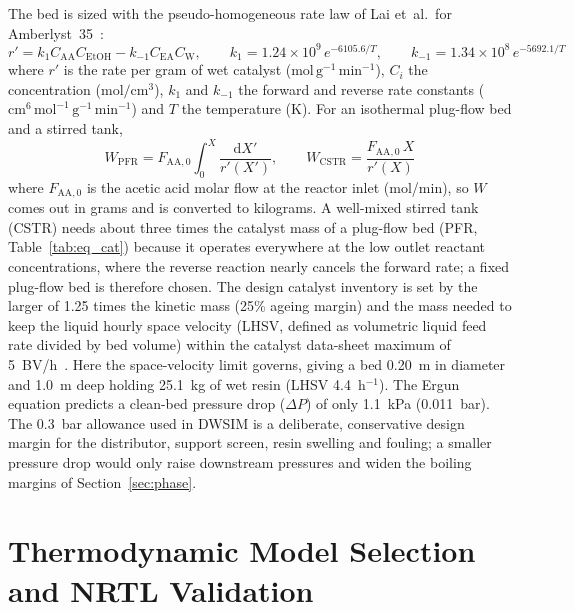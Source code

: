 \documentclass[10pt,a4paper]{article}
\begin{document}
The bed is sized with the pseudo-homogeneous rate law of Lai et~al.\ for Amberlyst~35~\cite{ref7}:
\begin{equation}
r' = k_1 C_{\mathrm{AA}} C_{\mathrm{EtOH}} - k_{-1} C_{\mathrm{EA}} C_{\mathrm{W}}, \qquad
k_1 = 1.24 \times 10^9\, e^{-6105.6/T}, \qquad
k_{-1} = 1.34 \times 10^8\, e^{-5692.1/T}
\label{eq:rate}
\end{equation}
where $r'$ is the rate per gram of wet catalyst ($\mathrm{mol\,g^{-1}\,min^{-1}}$), $C_i$ the concentration ($\mathrm{mol/cm^3}$), $k_1$ and $k_{-1}$ the forward and reverse rate constants ($\mathrm{cm^6\,mol^{-1}\,g^{-1}\,min^{-1}}$) and $T$ the temperature (K). For an isothermal plug-flow bed and a stirred tank,
\begin{equation}
W_{\mathrm{PFR}} = F_{\mathrm{AA},0} \int_0^X \frac{\mathrm{d}X'}{r'(X')}, \qquad
W_{\mathrm{CSTR}} = \frac{F_{\mathrm{AA},0}\, X}{r'(X)}
\label{eq:sizing}
\end{equation}
where $F_{\mathrm{AA},0}$ is the acetic acid molar flow at the reactor inlet (mol/min), so $W$ comes out in grams and is converted to kilograms. A well-mixed stirred tank (CSTR) needs about three times the catalyst mass of a plug-flow bed (PFR, Table~\ref{tab:eq_cat}) because it operates everywhere at the low outlet reactant concentrations, where the reverse reaction nearly cancels the forward rate; a fixed plug-flow bed is therefore chosen. The design catalyst inventory is set by the larger of 1.25 times the kinetic mass (25\% ageing margin) and the mass needed to keep the liquid hourly space velocity (LHSV, defined as volumetric liquid feed rate divided by bed volume) within the catalyst data-sheet maximum of 5~BV/h~\cite{ref12}. Here the space-velocity limit governs, giving a bed 0.20~m in diameter and 1.0~m deep holding 25.1~kg of wet resin (LHSV 4.4~h$^{-1}$). The Ergun equation predicts a clean-bed pressure drop ($\Delta P$) of only 1.1~kPa (0.011~bar). The 0.3~bar allowance used in DWSIM is a deliberate, conservative design margin for the distributor, support screen, resin swelling and fouling; a smaller pressure drop would only raise downstream pressures and widen the boiling margins of Section~\ref{sec:phase}.

\section{Thermodynamic Model Selection and NRTL Validation}
\label{sec:thermo}
\end{document}

